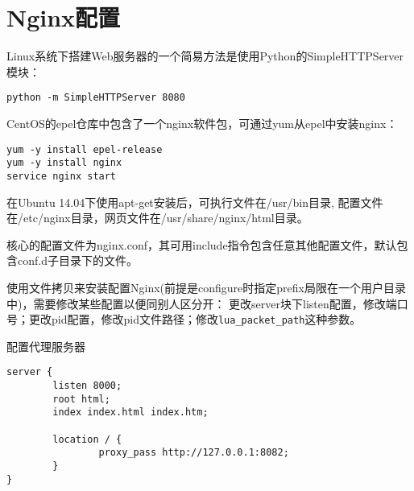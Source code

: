 \section{Nginx配置}

Linux系统下搭建Web服务器的一个简易方法是使用Python的SimpleHTTPServer模块：

\begin{verbatim}
python -m SimpleHTTPServer 8080
\end{verbatim}

CentOS的epel仓库中包含了一个nginx软件包，可通过yum从epel中安装nginx：
\begin{verbatim}
yum -y install epel-release
yum -y install nginx
service nginx start
\end{verbatim}

在Ubuntu 14.04下使用apt-get安装后，可执行文件在/usr/bin目录,
配置文件在/etc/nginx目录，网页文件在/usr/share/nginx/html目录。

核心的配置文件为nginx.conf，其可用include指令包含任意其他配置文件，默认包含conf.d子目录下的文件。

使用文件拷贝来安装配置Nginx(前提是configure时指定prefix局限在一个用户目录中)，需要修改某些配置以便同别人区分开：
更改server块下listen配置，修改端口号；更改pid配置，修改pid文件路径；修改\verb$lua_packet_path$这种参数。



配置代理服务器
\begin{verbatim}
server {
        listen 8000;
        root html;
        index index.html index.htm;

        location / { 
                proxy_pass http://127.0.0.1:8082;    
        }
}

\end{verbatim}
